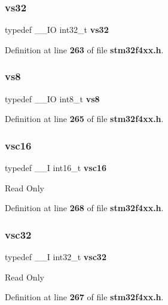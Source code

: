 \mbox{\label{group__Exported__types_ga476e2cb441f8e689433350ae2eeee510}} 
\subsubsection{vs32}
{\footnotesize\ttfamily typedef \+\_\+\+\_\+\+IO int32\+\_\+t \textbf{ vs32}}



Definition at line \textbf{ 263} of file \textbf{ stm32f4xx.\+h}.

\mbox{\label{group__Exported__types_ga9e5a203f00d2906af9466f68b4e72277}} 
\subsubsection{vs8}
{\footnotesize\ttfamily typedef \+\_\+\+\_\+\+IO int8\+\_\+t \textbf{ vs8}}



Definition at line \textbf{ 265} of file \textbf{ stm32f4xx.\+h}.

\mbox{\label{group__Exported__types_ga369ae0177b957e5afa7c1e62312f97c3}} 
\subsubsection{vsc16}
{\footnotesize\ttfamily typedef \+\_\+\+\_\+I int16\+\_\+t \textbf{ vsc16}}

Read Only 

Definition at line \textbf{ 268} of file \textbf{ stm32f4xx.\+h}.

\mbox{\label{group__Exported__types_gaec1d22666cf030b79051e5daa372fbc8}} 
\subsubsection{vsc32}
{\footnotesize\ttfamily typedef \+\_\+\+\_\+I int32\+\_\+t \textbf{ vsc32}}

Read Only 

Definition at line \textbf{ 267} of file \textbf{ stm32f4xx.\+h}.


